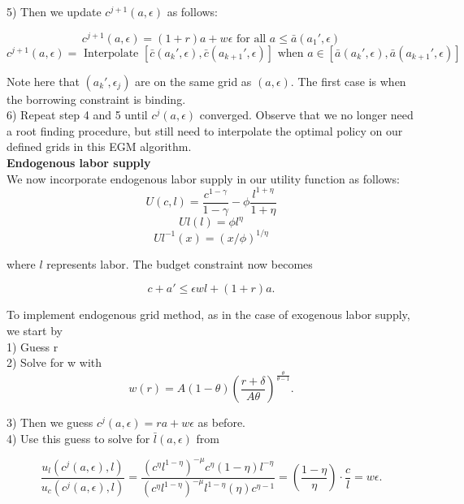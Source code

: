 \documentclass{article}
\begin{document}
	5) Then we update $c^{j+1}(a,\epsilon)$ as follows:
		
		$$c^{j+1}(a,\epsilon) = (1+r)a + w \epsilon  \text{ for all } a \leq \bar{a}(a_{1}', \epsilon)$$
		$$c^{j+1}(a,\epsilon) = \text{ Interpolate } [\bar{c}(a_{k}', \epsilon), \bar{c}(a_{k+1}', \epsilon)] \text{ when } a \in [\bar{a}(a_{k}', \epsilon), \bar{a}(a_{k+1}', \epsilon)]$$
		
		Note here that $(a_{k}', \epsilon_{j})$ are on the same grid as $(a,\epsilon)$. The first case is when the borrowing constraint is binding.  \\
		
	6) Repeat step 4 and 5 until $c^{j}(a,\epsilon)$ converged. Observe that we no longer need a root finding procedure, but still need to interpolate the optimal policy on our defined grids in this EGM algorithm. \\
		
	 
	
	\noindent\textbf{\Large Endogenous labor supply} \\
	
		We now incorporate endogenous labor supply in our utility function as follows:
		$$U(c,l) =  \frac{c^{1-\gamma}}{1-\gamma} - \phi\frac{l^{1+\eta}}{1+\eta}$$
		$$Ul(l) = \phi l^\eta$$
		$$Ul^{-1}(x) = (x/\phi)^{1/\eta}$$
		
		where $l$ represents labor. The budget constraint now becomes
		
		$$c+a' \leq \epsilon w l + (1 + r)a.$$
		
		To implement endogenous grid method, as in the case of exogenous labor supply, we start by \\ 
		
		1) Guess r \\
		
		2) Solve for w with \\
		
		$$w(r) = A(1-\theta)\left(\frac{r+\delta}{A\theta}\right)^{\frac{\theta}{\theta-1}}. $$
		
		3) Then we guess $c^{j}(a,\epsilon) = ra + w\epsilon$ as before. \\
		
		4) Use this guess to solve for $\bar{l}(a, \epsilon)$ from
		
		$$\frac{u_{l}(c^{j}(a,\epsilon),l)}{u_{c}(c^{j}(a,\epsilon),l)} = \frac{(c^\eta l^{1-\eta})^{-\mu}c^{\eta}(1-\eta)l^{-\eta} }{(c^\eta l^{1-\eta})^{-\mu}l^{1-\eta}(\eta) c^{\eta-1}} = (\frac{1-\eta}{\eta}) \cdot \frac{c}{l} = w\epsilon.$$
		
\end{document}
